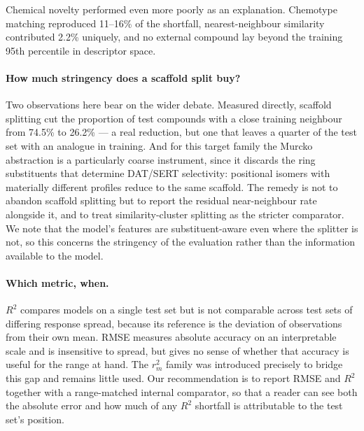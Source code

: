 \documentclass[11pt,a4paper]{article}
\begin{document}
Chemical novelty performed even more poorly as an explanation. Chemotype matching
reproduced 11--16\% of the shortfall, nearest-neighbour similarity contributed 2.2\%
uniquely, and no external compound lay beyond the training 95th percentile in
descriptor space.

\paragraph{How much stringency does a scaffold split buy?} Two observations here bear
on the wider debate. Measured directly, scaffold splitting cut the proportion of test
compounds with a close training neighbour from 74.5\% to 26.2\% --- a real reduction,
but one that leaves a quarter of the test set with an analogue in training. And for
this target family the Murcko abstraction is a particularly coarse instrument, since
it discards the ring substituents that determine DAT/SERT selectivity: positional
isomers with materially different profiles reduce to the same scaffold. The remedy is
not to abandon scaffold splitting but to report the residual near-neighbour rate
alongside it, and to treat similarity-cluster splitting as the stricter
comparator.\cite{Guo2024,Fooladi2025} We note that the model's features are
substituent-aware even where the splitter is not, so this concerns the stringency of
the evaluation rather than the information available to the model.

\paragraph{Which metric, when.} $R^2$ compares models on a single test set but is
not comparable across test sets of differing response spread, because its reference
is the deviation of observations from their own mean. RMSE measures absolute
accuracy on an interpretable scale and is insensitive to spread, but gives no sense
of whether that accuracy is useful for the range at hand. The $r_m^2$ family was
introduced precisely to bridge this gap \cite{Roy2009,Mitra2010} and remains little
used. Our recommendation is to report RMSE and $R^2$ together with a range-matched
internal comparator, so that a reader can see both the absolute error and how much
of any $R^2$ shortfall is attributable to the test set's position.
\end{document}
